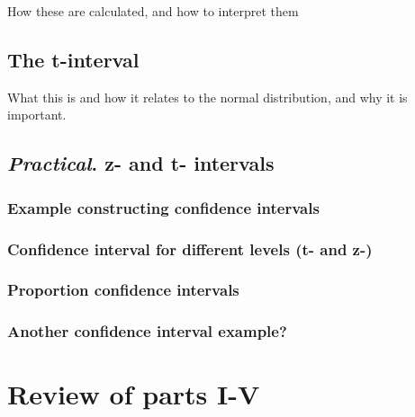 \documentclass[
]{book}
\begin{document}
How these are calculated, and how to interpret them

\hypertarget{the-t-interval}{%
\chapter{The t-interval}\label{the-t-interval}}

What this is and how it relates to the normal distribution, and why it is important.

\hypertarget{practical.-z--and-t--intervals}{%
\chapter{\texorpdfstring{\emph{Practical}. z- and t- intervals}{Practical. z- and t- intervals}}\label{practical.-z--and-t--intervals}}

\hypertarget{example-constructing-confidence-intervals}{%
\section{Example constructing confidence intervals}\label{example-constructing-confidence-intervals}}

\hypertarget{confidence-interval-for-different-levels-t--and-z-}{%
\section{Confidence interval for different levels (t- and z-)}\label{confidence-interval-for-different-levels-t--and-z-}}

\hypertarget{proportion-confidence-intervals}{%
\section{Proportion confidence intervals}\label{proportion-confidence-intervals}}

\hypertarget{another-confidence-interval-example}{%
\section{Another confidence interval example?}\label{another-confidence-interval-example}}

\hypertarget{part-review-of-parts-i-v}{%
\part{Review of parts I-V}\label{part-review-of-parts-i-v}}
\end{document}
